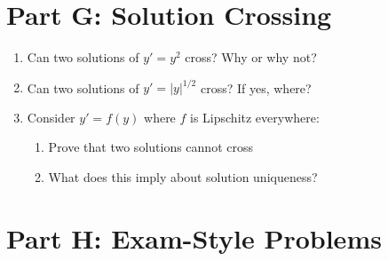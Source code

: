 \documentclass[12pt]{article}
\begin{document}
\section*{Part G: Solution Crossing}

\begin{enumerate}[start=18]
    \item Can two solutions of $y' = y^2$ cross? Why or why not?
    
    \item Can two solutions of $y' = |y|^{1/2}$ cross? If yes, where?
    
    \item Consider $y' = f(y)$ where $f$ is Lipschitz everywhere:
    \begin{enumerate}[label=(\alph*)]
        \item Prove that two solutions cannot cross
        \item What does this imply about solution uniqueness?
    \end{enumerate}
\end{enumerate}

\section*{Part H: Exam-Style Problems}
\end{document}

